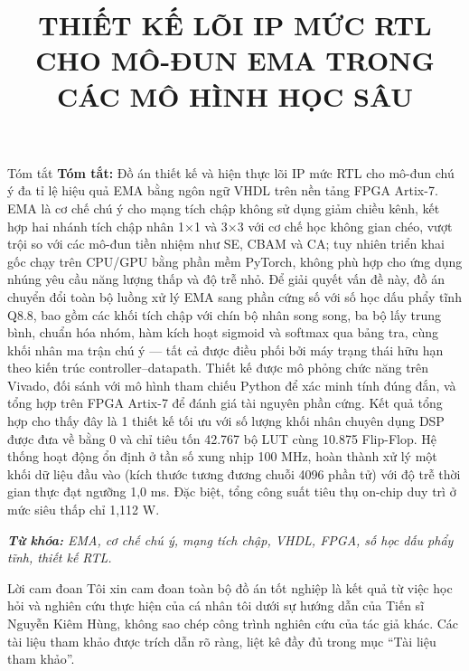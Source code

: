 \documentclass{uetgraduation}
\begin{document}
\title{THIẾT KẾ LÕI IP MỨC RTL CHO MÔ-ĐUN EMA TRONG CÁC MÔ HÌNH HỌC SÂU}
\makecovers

\begin{preamble}{Tóm tắt}
\textbf{Tóm tắt:} Đồ án thiết kế và hiện thực lõi IP mức RTL cho mô-đun chú ý đa tỉ lệ hiệu quả EMA bằng ngôn ngữ VHDL trên nền tảng FPGA Artix-7. EMA là cơ chế chú ý cho mạng tích chập không sử dụng giảm chiều kênh, kết hợp hai nhánh tích chập nhân 1×1 và 3×3 với cơ chế học không gian chéo, vượt trội so với các mô-đun tiền nhiệm như SE, CBAM và CA; tuy nhiên triển khai gốc chạy trên CPU/GPU bằng phần mềm PyTorch, không phù hợp cho ứng dụng nhúng yêu cầu năng lượng thấp và độ trễ nhỏ. Để giải quyết vấn đề này, đồ án chuyển đổi toàn bộ luồng xử lý EMA sang phần cứng số với số học dấu phẩy tĩnh Q8.8, bao gồm các khối tích chập với chín bộ nhân song song, ba bộ lấy trung bình, chuẩn hóa nhóm, hàm kích hoạt sigmoid và softmax qua bảng tra, cùng khối nhân ma trận chú ý — tất cả được điều phối bởi máy trạng thái hữu hạn theo kiến trúc controller–datapath. Thiết kế được mô phỏng chức năng trên Vivado, đối sánh với mô hình tham chiếu Python để xác minh tính đúng đắn, và tổng hợp trên FPGA Artix-7 để đánh giá tài nguyên phần cứng.
Kết quả tổng hợp cho thấy đây là 1 thiết kế tối ưu với số lượng khối nhân chuyên dụng DSP được đưa về bằng 0 và chỉ tiêu tốn 42.767 bộ LUT cùng 10.875 Flip-Flop. Hệ thống hoạt động ổn định ở tần số xung nhịp 100 MHz, hoàn thành xử lý một khối dữ liệu đầu vào (kích thước tương đương chuỗi 4096 phần tử) với độ trễ thời gian thực đạt ngưỡng 1,0 ms. Đặc biệt, tổng công suất tiêu thụ on-chip duy trì ở mức siêu thấp chỉ 1,112 W.

\textit{\textbf{Từ khóa:} EMA, cơ chế chú ý, mạng tích chập, VHDL, FPGA, số học dấu phẩy tĩnh, thiết kế RTL.}
\end{preamble}

\begin{preamble}{Lời cam đoan}
Tôi xin cam đoan toàn bộ đồ án tốt nghiệp là kết quả từ việc học hỏi và nghiên cứu thực hiện của cá nhân tôi dưới sự hướng dẫn của Tiến sĩ Nguyễn Kiêm Hùng, không sao chép công trình nghiên cứu của tác giả khác. Các tài liệu tham khảo được trích dẫn rõ ràng, liệt kê đầy đủ trong mục “Tài liệu tham khảo”.
\end{preamble}
\end{document}
